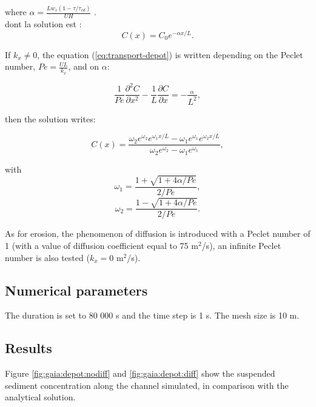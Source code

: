 where $ \alpha = \frac{Lw_s (1-\tau/\tau_{cd})  }{UH} $ .\\

 dont la solution est :
\begin{equation}
C(x)=C_0 e^{-\alpha x /L}.
\label{eq:sol4}
\end{equation}

If $k_x\neq 0$, the equation (\ref{eq:transport-depot}) is written
depending on the Peclet number, $Pe=\frac{UL}{k_x}$, and on $\alpha$:

\begin{equation}
\frac{1}{Pe} \frac{\partial^2 C}{\partial x^2} -
\frac{1}{L} \frac{\partial C}{\partial x} =
- \frac{ _\alpha}{ L^2},
\label{eq:sol-transport}
\end{equation}

then the solution writes:

\begin{equation}
C(x)= \frac{ \omega_2 e^{\omega_2} e^{\omega_1 x/L} -
\omega_1 e^{\omega_1} e^{\omega_2 x/L}}{ \omega_2 e^{\omega_2}-
\omega_1 e^{\omega_1}  },
\label{eq:}
\end{equation}

with
\begin{equation}
\omega _1 = \frac{ 1 + \sqrt{1+4 \alpha/Pe}  }{2/Pe},
\label{eq:}
\end{equation}
\begin{equation}
\omega _2 = \frac{ 1 - \sqrt{1+4 \alpha/Pe}  }{2/Pe}.
\label{eq:}
\end{equation}

As for erosion, the phenomenon of diffusion is introduced with a Peclet
number of 1 (with a value of diffusion coefficient equal to 75
m$^2$/s), an infinite Peclet number is also tested ($k_x=0$ m$^2$/s).

\subsection{Numerical parameters}

The duration is set to 80 000 s and the time step is 1 s.
The mesh size is 10 m.

\subsection{Results}

Figure \ref{fig:gaia:depot:nodiff} and \ref{fig:gaia:depot:diff} show the
suspended sediment concentration along the channel simulated, in
comparison with the analytical solution.

